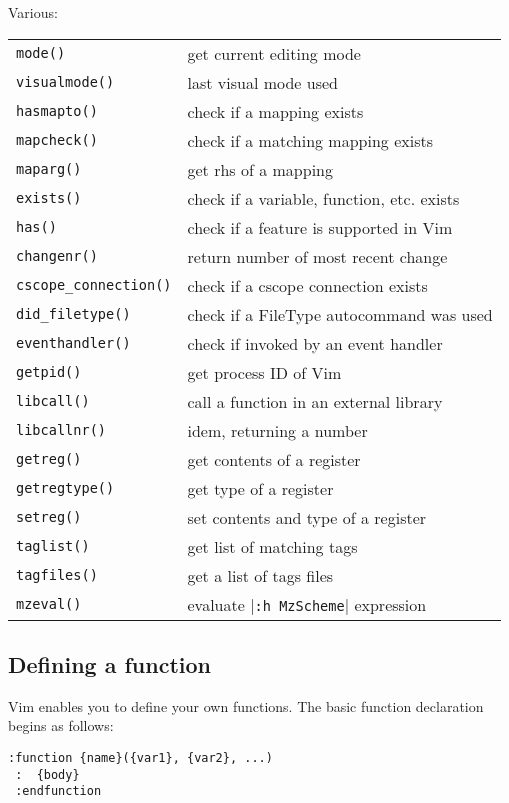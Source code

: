 Various:
\label{various-functions}
\begin{center} \begin{tabular}{l l}
				\verb!mode()! & get current editing mode \\
				\verb!visualmode()! & last visual mode used \\
				\verb!hasmapto()! & check if a mapping exists \\
				\verb!mapcheck()! & check if a matching mapping exists \\
				\verb!maparg()! & get rhs of a mapping \\
				\verb!exists()! & check if a variable, function, etc. exists \\
				\verb!has()! & check if a feature is supported in Vim \\
				\verb!changenr()! & return number of most recent change \\
				\verb!cscope_connection()! & check if a cscope connection exists \\
				\verb!did_filetype()! & check if a FileType autocommand was used \\
				\verb!eventhandler()! & check if invoked by an event handler \\
				\verb!getpid()! & get process ID of Vim \\
				\verb!libcall()! & call a function in an external library \\
				\verb!libcallnr()! & idem, returning a number \\
				\verb!getreg()! & get contents of a register \\
				\verb!getregtype()! & get type of a register \\
				\verb!setreg()! & set contents and type of a register \\
				\verb!taglist()! & get list of matching tags \\
				\verb!tagfiles()! & get a list of tags files \\
				\verb!mzeval()! & evaluate |\verb!:h MzScheme!| expression \\
\end{tabular} \end{center}
\subsection{Defining a function}
Vim enables you to define your own functions.
The basic function declaration begins as follows:

\begin{Verbatim}[samepage=true]
 :function {name}({var1}, {var2}, ...)
 :  {body}
 :endfunction
\end{Verbatim}

